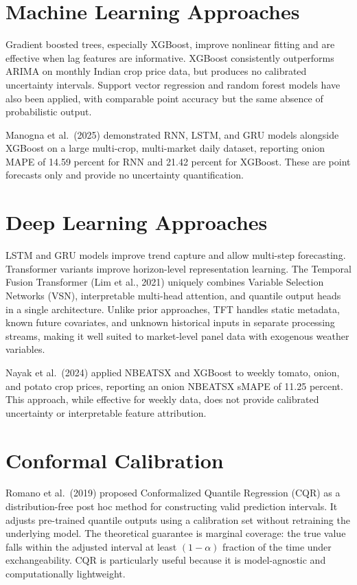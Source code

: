 \documentclass[12pt,a4paper]{report}
\begin{document}
\section{Machine Learning Approaches}

Gradient boosted trees, especially XGBoost, improve nonlinear fitting and are effective when
lag features are informative. XGBoost consistently outperforms ARIMA on monthly Indian crop
price data, but produces no calibrated uncertainty intervals. Support vector regression and
random forest models have also been applied, with comparable point accuracy but the same
absence of probabilistic output.

Manogna et al.\ (2025) demonstrated RNN, LSTM, and GRU models alongside XGBoost on a
large multi-crop, multi-market daily dataset, reporting onion MAPE of 14.59 percent for RNN
and 21.42 percent for XGBoost. These are point forecasts only and provide no uncertainty
quantification.

\section{Deep Learning Approaches}

LSTM and GRU models improve trend capture and allow multi-step forecasting. Transformer
variants improve horizon-level representation learning. The Temporal Fusion Transformer
(Lim et al., 2021) uniquely combines Variable Selection Networks (VSN), interpretable
multi-head attention, and quantile output heads in a single architecture. Unlike prior
approaches, TFT handles static metadata, known future covariates, and unknown historical
inputs in separate processing streams, making it well suited to market-level panel data
with exogenous weather variables.

Nayak et al.\ (2024) applied NBEATSX and XGBoost to weekly tomato, onion, and potato
crop prices, reporting an onion NBEATSX sMAPE of 11.25 percent. This approach, while
effective for weekly data, does not provide calibrated uncertainty or interpretable feature
attribution.

\section{Conformal Calibration}

Romano et al.\ (2019) proposed Conformalized Quantile Regression (CQR) as a
distribution-free post hoc method for constructing valid prediction intervals. It adjusts
pre-trained quantile outputs using a calibration set without retraining the underlying model.
The theoretical guarantee is marginal coverage: the true value falls within the adjusted
interval at least $(1-\alpha)$ fraction of the time under exchangeability. CQR is
particularly useful because it is model-agnostic and computationally lightweight.
\end{document}
